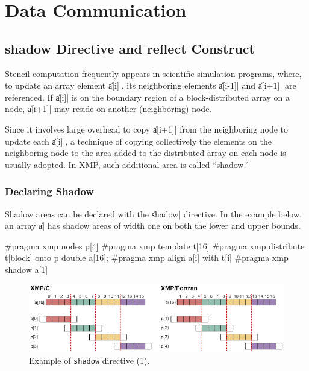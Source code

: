 \section{Data Communication}

\subsection{{\bf shadow} Directive and {\bf reflect} Construct}

Stencil computation frequently appears in scientific simulation programs,
where, to update an array element \|a[i]|, its neighboring elements
\|a[i-1]| and \|a[i+1]| are referenced. If \|a[i]| is on the boundary
region of a block-distributed array on a node, \|a[i+1]| may reside on
another (neighboring) node.

Since it involves large overhead to copy \|a[i+1]| from the neighboring
node to update each \|a[i]|, a technique of copying collectively the
elements on the neighboring node to the area added to the distributed
array on each node is usually adopted. In XMP, such additional area is
called ``shadow.''

\subsubsection{Declaring Shadow}


Shadow areas can be declared with the \|shadow| directive. In the example
below, an array \|a| has shadow areas of width one on both the lower and
upper bounds.

\begin{XCexample}
#pragma xmp nodes p[4]
#pragma xmp template t[16]
#pragma xmp distribute t[block] onto p
double a[16];
#pragma xmp align a[i] with t[i]
#pragma xmp shadow a[1]
\end{XCexample}


\begin{figure}
  \centering
  \includegraphics[width=\textwidth]{figs/shadow.png}
  \caption{Example of {\tt shadow} directive (1).}
\end{figure}

